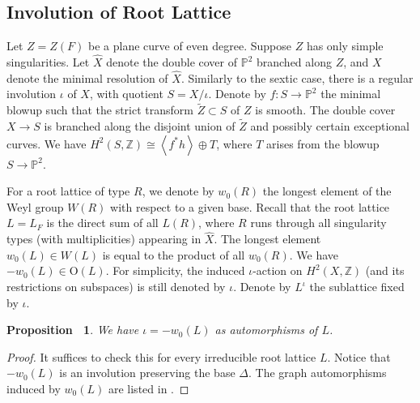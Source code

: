 \documentclass[12pt,reqno,a4paper]{amsart}
\newtheorem{prop}[thm]{Proposition~}
\newtheorem{ques}[thm]{Question~}
\theoremstyle{remark}
\theoremstyle{definition}
\newcommand{\ZZ}{\mathbb{Z}}
\newcommand{\PP}{\mathbb{P}}
\newcommand\Or{\mathrm{O}}
\begin{document}

\subsection{Involution of Root Lattice}
Let $Z=Z(F)$ be a plane curve of even degree. Suppose $Z$ has only simple singularities. 
Let $\widehat{X}$ denote the double cover of $\PP^2$ branched along $Z$, and $X$ denote the minimal resolution of $\widehat{X}$.
Similarly to the sextic case, there is a regular involution $\iota$ of $X$, with quotient $S=X/\iota$. Denote by $f\colon S\to \PP^2$ the minimal blowup such that the strict transform $\widetilde{Z}\subset S$ of $Z$ is smooth. The double cover $X\to S$ is branched along the disjoint union of $\widetilde{Z}$ and possibly certain exceptional curves. We have $H^2(S,\ZZ)\cong \left\langle f^* h\right\rangle\oplus T$, where $T$ arises from the blowup $S\to \PP^2$.

For a root lattice of type $R$, we denote by $w_0(R)$ the longest element of the Weyl group $W(R)$ with respect to a given base.
Recall that the root lattice $L=L_F$ is the direct sum of all $L(R)$, where $R$ runs through all singularity types (with multiplicities) appearing in $\widehat{X}$. 
The longest element $w_0(L)\in W(L)$ is equal to the product of all $w_0(R)$. We have $-w_0(L)\in \Or(L)$. For simplicity, the induced $\iota$-action on $H^2(X,\ZZ)$ (and its restrictions on subspaces) is still denoted by $\iota$. Denote by $L^\iota$ the sublattice fixed by $\iota$. %
\begin{prop}
We have $\iota=-w_0(L)$ as automorphisms of $L$.
\end{prop}
\begin{proof}
It suffices to check this for every irreducible root lattice $L$. %
Notice that $-w_0(L)$ is an involution preserving the base $\Delta$. The graph automorphisms induced by $w_0(L)$ are listed in \cite[PLATE I--X]{bourbaki2002lie4-6}.
\end{proof}
\end{document}
